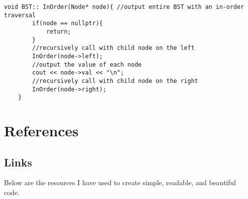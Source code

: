 \documentclass[letterpaper, 10pt,DIV=13]{scrartcl}
\numberwithin{equation}{section} %
\numberwithin{figure}{section} %
\numberwithin{table}{section} %
\begin{document}
\begin{lstlisting}[frame=single, ]
    void BST:: InOrder(Node* node){ //output entire BST with an in-order traversal
        if(node == nullptr){
            return;
        }
        //recursively call with child node on the left
        InOrder(node->left);
        //output the value of each node
        cout << node->val << "\n";
        //recursively call with child node on the right
        InOrder(node->right);
    }

\end{lstlisting}

\pagebreak

\section{References}

\subsection{Links}
Below are the resources I have used to create simple, readable, and beautiful code.
\end{document}
